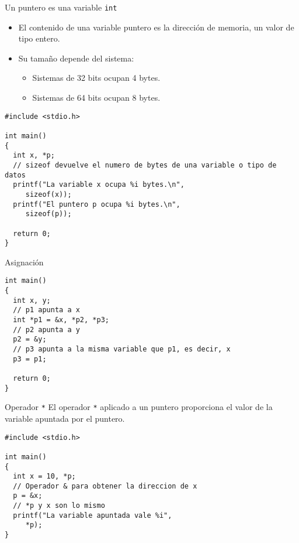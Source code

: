 \documentclass[xcolor={usenames,svgnames,dvipsnames}, aspectratio=169]{beamer}
\begin{document}
\begin{frame}[label={sec:orgde55108},fragile]{Un puntero es una variable \texttt{int}}
 \begin{itemize}
\item El contenido de una variable puntero es la dirección de memoria, un valor de tipo entero.
\item Su tamaño depende del sistema:
\begin{itemize}
\item Sistemas de 32 bits ocupan 4 bytes.
\item Sistemas de 64 bits ocupan 8 bytes.
\end{itemize}
\end{itemize}

\lstset{language=C,label= ,caption= ,captionpos=b,numbers=none}
\begin{lstlisting}
#include <stdio.h>

int main()
{
  int x, *p;
  // sizeof devuelve el numero de bytes de una variable o tipo de datos
  printf("La variable x ocupa %i bytes.\n", 
	 sizeof(x));
  printf("El puntero p ocupa %i bytes.\n",
	 sizeof(p));

  return 0;
}

\end{lstlisting}
\end{frame}

\begin{frame}[label={sec:org68f25af},fragile]{Asignación}
 \lstset{language=C,label= ,caption= ,captionpos=b,numbers=none}
\begin{lstlisting}
int main()
{
  int x, y;
  // p1 apunta a x
  int *p1 = &x, *p2, *p3;
  // p2 apunta a y
  p2 = &y;
  // p3 apunta a la misma variable que p1, es decir, x
  p3 = p1;

  return 0;
}
\end{lstlisting}
\end{frame}

\begin{frame}[label={sec:org2907eca},fragile]{Operador \texttt{*}}
 El operador \texttt{*} aplicado a un puntero proporciona el valor de la variable apuntada por el puntero.

\lstset{language=C,label= ,caption= ,captionpos=b,numbers=none}
\begin{lstlisting}
#include <stdio.h>

int main()
{
  int x = 10, *p;
  // Operador & para obtener la direccion de x
  p = &x;
  // *p y x son lo mismo
  printf("La variable apuntada vale %i",
	 *p);
}
\end{lstlisting}
\end{frame}
\end{document}
